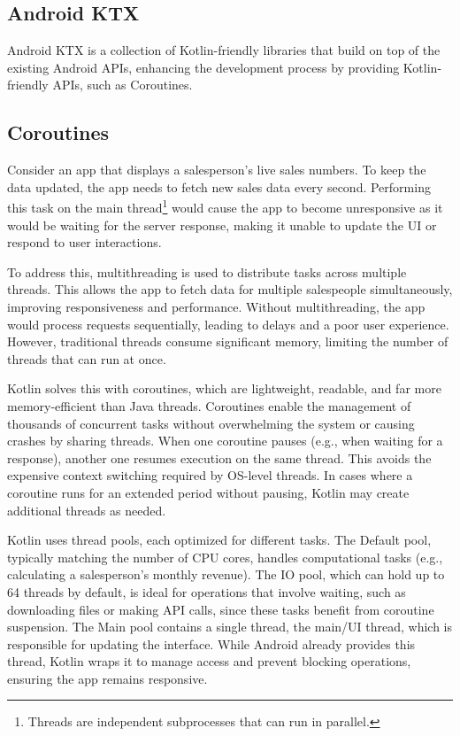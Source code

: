 \documentclass[a4paper,11pt]{article}
\begin{document}
\subsection{Android KTX}
Android KTX is a collection of Kotlin-friendly libraries that build on top of the existing Android APIs, enhancing the development process by providing Kotlin-friendly APIs, such as Coroutines.

\subsection{Coroutines}
Consider an app that displays a salesperson's live sales numbers. To keep the data updated, the app needs to fetch new sales data every second. Performing this task on the main thread\footnote{Threads are independent subprocesses that can run in parallel.} would cause the app to become unresponsive as it would be waiting for the server response, making it unable to update the UI or respond to user interactions.

To address this, multithreading is used to distribute tasks across multiple threads. This allows the app to fetch data for multiple salespeople simultaneously, improving responsiveness and performance. Without multithreading, the app would process requests sequentially, leading to delays and a poor user experience. However, traditional threads consume significant memory, limiting the number of threads that can run at once.

Kotlin solves this with coroutines, which are lightweight, readable, and far more memory-efficient than Java threads. Coroutines enable the management of thousands of concurrent tasks without overwhelming the system or causing crashes by sharing threads. When one coroutine pauses (e.g., when waiting for a response), another one resumes execution on the same thread. This avoids the expensive context switching required by OS-level threads. In cases where a coroutine runs for an extended period without pausing, Kotlin may create additional threads as needed.

Kotlin uses thread pools, each optimized for different tasks. The Default pool, typically matching the number of CPU cores, handles computational tasks (e.g., calculating a salesperson's monthly revenue). The IO pool, which can hold up to 64 threads by default, is ideal for operations that involve waiting, such as downloading files or making API calls, since these tasks benefit from coroutine suspension. The Main pool contains a single thread, the main/UI thread, which is responsible for updating the interface. While Android already provides this thread, Kotlin wraps it to manage access and prevent blocking operations, ensuring the app remains responsive.
\end{document}
